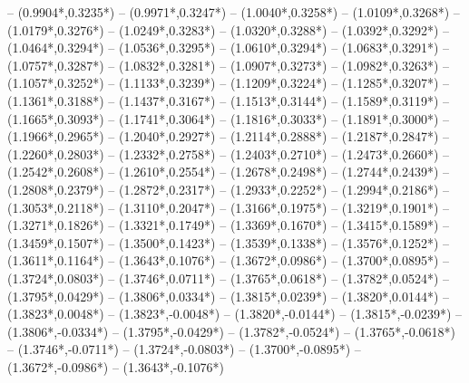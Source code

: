 {	-- ({0.9904*\dx},{0.3235*\dy})
	-- ({0.9971*\dx},{0.3247*\dy})
	-- ({1.0040*\dx},{0.3258*\dy})
	-- ({1.0109*\dx},{0.3268*\dy})
	-- ({1.0179*\dx},{0.3276*\dy})
	-- ({1.0249*\dx},{0.3283*\dy})
	-- ({1.0320*\dx},{0.3288*\dy})
	-- ({1.0392*\dx},{0.3292*\dy})
	-- ({1.0464*\dx},{0.3294*\dy})
	-- ({1.0536*\dx},{0.3295*\dy})
	-- ({1.0610*\dx},{0.3294*\dy})
	-- ({1.0683*\dx},{0.3291*\dy})
	-- ({1.0757*\dx},{0.3287*\dy})
	-- ({1.0832*\dx},{0.3281*\dy})
	-- ({1.0907*\dx},{0.3273*\dy})
	-- ({1.0982*\dx},{0.3263*\dy})
	-- ({1.1057*\dx},{0.3252*\dy})
	-- ({1.1133*\dx},{0.3239*\dy})
	-- ({1.1209*\dx},{0.3224*\dy})
	-- ({1.1285*\dx},{0.3207*\dy})
	-- ({1.1361*\dx},{0.3188*\dy})
	-- ({1.1437*\dx},{0.3167*\dy})
	-- ({1.1513*\dx},{0.3144*\dy})
	-- ({1.1589*\dx},{0.3119*\dy})
	-- ({1.1665*\dx},{0.3093*\dy})
	-- ({1.1741*\dx},{0.3064*\dy})
	-- ({1.1816*\dx},{0.3033*\dy})
	-- ({1.1891*\dx},{0.3000*\dy})
	-- ({1.1966*\dx},{0.2965*\dy})
	-- ({1.2040*\dx},{0.2927*\dy})
	-- ({1.2114*\dx},{0.2888*\dy})
	-- ({1.2187*\dx},{0.2847*\dy})
	-- ({1.2260*\dx},{0.2803*\dy})
	-- ({1.2332*\dx},{0.2758*\dy})
	-- ({1.2403*\dx},{0.2710*\dy})
	-- ({1.2473*\dx},{0.2660*\dy})
	-- ({1.2542*\dx},{0.2608*\dy})
	-- ({1.2610*\dx},{0.2554*\dy})
	-- ({1.2678*\dx},{0.2498*\dy})
	-- ({1.2744*\dx},{0.2439*\dy})
	-- ({1.2808*\dx},{0.2379*\dy})
	-- ({1.2872*\dx},{0.2317*\dy})
	-- ({1.2933*\dx},{0.2252*\dy})
	-- ({1.2994*\dx},{0.2186*\dy})
	-- ({1.3053*\dx},{0.2118*\dy})
	-- ({1.3110*\dx},{0.2047*\dy})
	-- ({1.3166*\dx},{0.1975*\dy})
	-- ({1.3219*\dx},{0.1901*\dy})
	-- ({1.3271*\dx},{0.1826*\dy})
	-- ({1.3321*\dx},{0.1749*\dy})
	-- ({1.3369*\dx},{0.1670*\dy})
	-- ({1.3415*\dx},{0.1589*\dy})
	-- ({1.3459*\dx},{0.1507*\dy})
	-- ({1.3500*\dx},{0.1423*\dy})
	-- ({1.3539*\dx},{0.1338*\dy})
	-- ({1.3576*\dx},{0.1252*\dy})
	-- ({1.3611*\dx},{0.1164*\dy})
	-- ({1.3643*\dx},{0.1076*\dy})
	-- ({1.3672*\dx},{0.0986*\dy})
	-- ({1.3700*\dx},{0.0895*\dy})
	-- ({1.3724*\dx},{0.0803*\dy})
	-- ({1.3746*\dx},{0.0711*\dy})
	-- ({1.3765*\dx},{0.0618*\dy})
	-- ({1.3782*\dx},{0.0524*\dy})
	-- ({1.3795*\dx},{0.0429*\dy})
	-- ({1.3806*\dx},{0.0334*\dy})
	-- ({1.3815*\dx},{0.0239*\dy})
	-- ({1.3820*\dx},{0.0144*\dy})
	-- ({1.3823*\dx},{0.0048*\dy})
	-- ({1.3823*\dx},{-0.0048*\dy})
	-- ({1.3820*\dx},{-0.0144*\dy})
	-- ({1.3815*\dx},{-0.0239*\dy})
	-- ({1.3806*\dx},{-0.0334*\dy})
	-- ({1.3795*\dx},{-0.0429*\dy})
	-- ({1.3782*\dx},{-0.0524*\dy})
	-- ({1.3765*\dx},{-0.0618*\dy})
	-- ({1.3746*\dx},{-0.0711*\dy})
	-- ({1.3724*\dx},{-0.0803*\dy})
	-- ({1.3700*\dx},{-0.0895*\dy})
	-- ({1.3672*\dx},{-0.0986*\dy})
	-- ({1.3643*\dx},{-0.1076*\dy})
}

